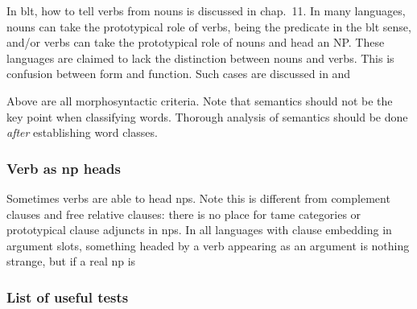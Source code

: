 \documentclass[UTF8, a4paper, oneside, scheme=plain]{ctexart}
\newcommand*{\citechap}[1]{chap.~{#1}}
\begin{document}
In \ac{blt}, how to tell verbs from nouns is discussed in \citechap{11}. 
In many languages, nouns can take the prototypical role of verbs, 
being the predicate in the \ac{blt} sense, 
and/or verbs can take the prototypical role of nouns and head an NP.  
These languages are claimed to lack the distinction between nouns and verbs. 
This is confusion between form and function.
Such cases are discussed in  and %



Above are all morphosyntactic criteria. Note that semantics should not be the key point when classifying words.
Thorough analysis of semantics should be done \emph{after} establishing word classes.

\subsubsection{Verb as \ac{np} heads}\label{sec:verb-as-np-head}

Sometimes verbs are able to head \ac{np}s.
Note this is different from complement clauses and free relative clauses:
there is no place for \ac{tame} categories or prototypical clause adjuncts in \ac{np}s.
In all languages with clause embedding in argument slots,
something headed by a verb appearing as an argument is nothing strange,
but if a real \ac{np} is 

\subsubsection{List of useful tests}
\end{document}
